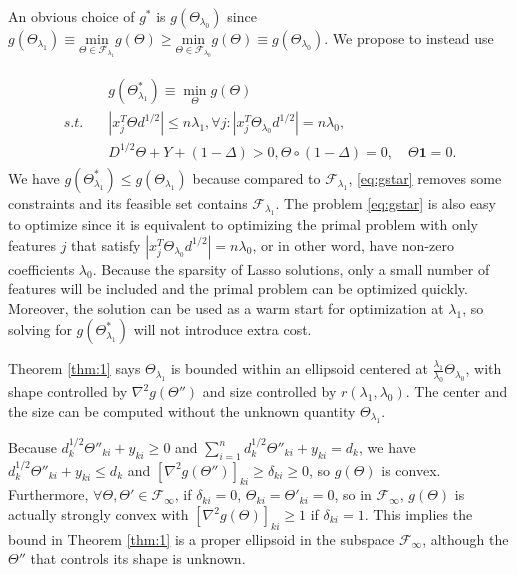 An obvious choice of $g^*$ is $g(\Theta_{\lambda_0})$ since $g(\Theta_{\lambda_1})\equiv\underset{\Theta\in \mathcal{F}_{\lambda_1}}{\mathrm{min}}g(\Theta)\geq\underset{\Theta\in \mathcal{F}_{\lambda_0}}{\mathrm{min}}g(\Theta)\equiv g\left(\Theta_{\lambda_0}\right)$. We propose to instead use 

\begin{gather}
    \label{eq:gstar}
    \begin{aligned}
        &g(\Theta^*_{\lambda_1})\equiv\min_\Theta g(\Theta)\\
        s.t.\quad &|x_j^T\Theta d^{1/2}|\leq n\lambda_1,\forall j:|x_j^T\Theta_{\lambda_0} d^{1/2}|= n\lambda_0,\\&D^{1/2}\Theta+Y+(1-\Delta)> 0, \Theta\circ(1-\Delta)=0,\quad \Theta\mathbf{1}=0.
    \end{aligned}
\end{gather}
We have $g(\Theta^*_{\lambda_1})\leq g(\Theta_{\lambda_1})$ because compared to $\mathcal{F}_{\lambda_1}$, \eqref{eq:gstar} removes some constraints and its feasible set contains $\mathcal{F}_{\lambda_1}$. The problem \eqref{eq:gstar} is also easy to optimize since it is equivalent to optimizing the primal problem with only features $j$ that satisfy $|x_j^T\Theta_{\lambda_0} d^{1/2}|= n\lambda_0$, or in other word, have non-zero coefficients $\lambda_0$. Because the sparsity of Lasso solutions, only a small number of features will be included and the primal problem can be optimized quickly. Moreover, the solution can be used as a warm start for optimization at $\lambda_1$, so solving for $g(\Theta^*_{\lambda_1})$ will not introduce extra cost.

Theorem \ref{thm:1} says $\Theta_{\lambda_1}$ is bounded within an ellipsoid centered at $\frac{\lambda_1}{\lambda_0}\Theta_{\lambda_0}$, with shape controlled by $\nabla^2g(\Theta'')$ and size controlled by $r(\lambda_1,\lambda_0)$. The center and the size can be computed without the unknown quantity $\Theta_{\lambda_1}$. 

 Because $d_k^{1/2}\Theta''_{ki}+y_{ki}\geq 0$ and $\sum_{i=1}^nd_k^{1/2}\Theta''_{ki}+y_{ki}=d_k$, we have $d_k^{1/2}\Theta''_{ki}+y_{ki}\leq d_k$ and $[\nabla^2 g(\Theta'')]_{ki}\geq\delta_{ki}\geq 0$, so $g(\Theta)$ is convex. Furthermore, $\forall\Theta,\Theta'\in\mathcal{F}_{\infty}$, if $\delta_{ki}=0$, $\Theta_{ki}=\Theta'_{ki}=0$, so in $\mathcal{F}_{\infty}$, $g(\Theta)$ is actually strongly convex with $[\nabla^2 g(\Theta)]_{ki}\geq 1$ if $\delta_{ki}=1$. This implies the bound in Theorem \ref{thm:1} is a proper ellipsoid in the subspace $\mathcal{F}_{\infty}$, although the $\Theta''$ that controls its shape is unknown.

